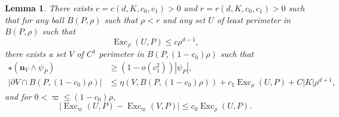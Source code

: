 \documentclass[reqno,10pt]{amsart}
\DeclareMathOperator{\Exc}{Exc}
\newcommand{\normal}{\mathbf n}
\newtheorem{lemma}[theorem]{Lemma}
\theoremstyle{definition}
\numberwithin{equation}{section}
\begin{document}
\begin{lemma}\label{single mollify}
There exists $c = c(d, K, c_0, c_1) > 0$ and $r = r(d, K, c_0, c_1) > 0$ such that for any ball $B(P, \rho)$ such that $\rho < r$ and any set $U$ of least perimeter in $B(P, \rho)$ such that
$$\Exc_\rho (U, P) \leq c\rho^{d - 1},$$
there exists a set $V$ of $C^1$ perimeter in $B(P, (1 - c_0)\rho)$ such that
\begin{align}
\star(\normal_V \wedge \psi_P) &\geq (1 - o(c_1^2))|\psi_P|, \label{single mollify normal}\\
|\partial V \cap B(P, (1 - c_0)\rho)| &\leq \eta(V, B(P, (1 - c_0)\rho)) + c_1 \Exc_\rho (U, P) + C|K| \rho^{d + 1}, \label{single mollify minimality}
\end{align}
and for $0 < \varpi \leq (1 - c_0)\rho$,
\begin{equation}
|\Exc_\varpi (U, P) - \Exc_\varpi (V, P)| \leq c_0 \Exc_\rho (U, P). \label{single mollify excess}
\end{equation}
\end{lemma}
\end{document}
